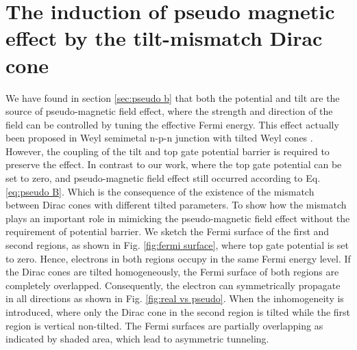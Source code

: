 \section{The induction of pseudo magnetic effect by the tilt-mismatch Dirac cone}
    We have found in section \ref{sec:pseudo b} that both the potential and tilt are the source of pseudo-magnetic field effect, where the strength and direction of the field can be controlled by tuning the effective Fermi energy.
    This effect actually been proposed in Weyl semimetal n-p-n junction with tilted Weyl cones \cite{Yesilyurt2017a}.
    However, the coupling of the tilt and top gate potential barrier is required to preserve the effect. In contrast to our work, where the top gate potential can be set to zero, and pseudo-magnetic field effect still occurred according to Eq. \ref{eq:pseudo B}.
    Which is the consequence of the existence of the mismatch between Dirac cones with different tilted parameters. 
    To show how the mismatch plays an important role in mimicking the pseudo-magnetic field effect without the requirement of potential barrier. 
    We sketch the Fermi surface of the first and second regions, as shown in Fig. \ref{fig:fermi surface}, where top gate potential is set to zero. 
    Hence, electrons in both regions occupy in the same Fermi energy level. 
    If the Dirac cones are tilted homogeneously, the Fermi surface of both regions are completely overlapped. 
    Consequently, the electron can symmetrically propagate in all directions as shown in Fig. \ref{fig:real vs pseudo}. 
    When the inhomogeneity is introduced, where only the Dirac cone in the second region is tilted while the first region is vertical non-tilted. 
    The Fermi surfaces are partially overlapping as indicated by shaded area, which lead to asymmetric tunneling.
    
